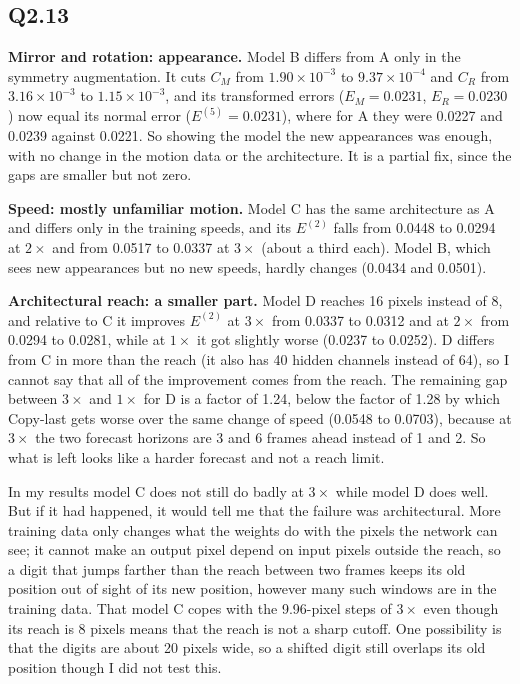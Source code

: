 \documentclass[11pt,letterpaper]{article}
\begin{document}
\subsection*{Q2.13}

\textbf{Mirror and rotation: appearance.} Model B differs from A only in the symmetry augmentation. It cuts
$C_M$ from $1.90\times10^{-3}$ to $9.37\times10^{-4}$ and $C_R$ from $3.16\times10^{-3}$ to $1.15\times10^{-3}$,
and its transformed errors ($E_M=0.0231$, $E_R=0.0230$) now equal its normal error ($E^{(5)}=0.0231$), where
for A they were 0.0227 and 0.0239 against 0.0221. So showing the model the new appearances was enough, with no
change in the motion data or the architecture. It is a partial fix, since the gaps are smaller but not zero.

\textbf{Speed: mostly unfamiliar motion.} Model C has the same architecture as A and differs only in the
training speeds, and its $E^{(2)}$ falls from 0.0448 to 0.0294 at $2\times$ and from 0.0517 to 0.0337 at
$3\times$ (about a third each). Model B, which sees new appearances but no new speeds, hardly changes
(0.0434 and 0.0501).

\textbf{Architectural reach: a smaller part.} Model D reaches 16 pixels instead of 8, and relative to C it improves
$E^{(2)}$ at $3\times$ from 0.0337 to 0.0312 and at
$2\times$ from 0.0294 to 0.0281, while at $1\times$ it got slightly worse (0.0237 to 0.0252). D differs from C in
more than the reach (it also has 40 hidden channels instead of 64), so I cannot say that all of the improvement comes
from the reach. The remaining gap between $3\times$ and $1\times$ for D is a factor of 1.24, below the factor of
1.28 by which Copy-last gets worse over the same change of speed (0.0548 to 0.0703), because at $3\times$ the two
forecast horizons are 3 and 6 frames ahead instead of 1 and 2. So what is left looks like a harder forecast and not
a reach limit.

In my results model C does not still do badly at $3\times$ while model D does well. But if it had happened, it would tell me that the failure was architectural. More training data only changes
what the weights do with the pixels the network can see; it cannot make an output pixel depend on input pixels
outside the reach, so a digit that jumps farther than the reach between two frames keeps its old position out of
sight of its new position, however many such windows are in the training data. That model C copes with the
9.96-pixel steps of $3\times$ even though its reach is 8 pixels means that the reach is not a sharp cutoff. One
possibility is that the digits are about 20 pixels wide, so a shifted digit still overlaps its old position though I did
not test this.
\end{document}
